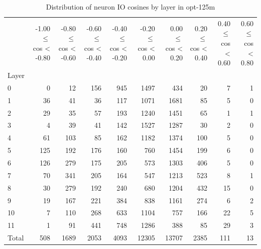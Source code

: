 \begin{table}
\caption{Distribution of neuron IO cosines by layer in opt-125m}
\label{tab:opt-125m_half_coarse}
\begin{tabular}{lrrrrrrrrr}
 & -1.00 $\leq$ cos < -0.80 & -0.80 $\leq$ cos < -0.60 & -0.60 $\leq$ cos < -0.40 & -0.40 $\leq$ cos < -0.20 & -0.20 $\leq$ cos < 0.00 & 0.00 $\leq$ cos < 0.20 & 0.20 $\leq$ cos < 0.40 & 0.40 $\leq$ cos < 0.60 & 0.60 $\leq$ cos < 0.80 \\
Layer &  &  &  &  &  &  &  &  &  \\
0 & 0 & 12 & 156 & 945 & 1497 & 434 & 20 & 7 & 1 \\
1 & 36 & 41 & 36 & 117 & 1071 & 1681 & 85 & 5 & 0 \\
2 & 29 & 35 & 57 & 193 & 1240 & 1451 & 65 & 1 & 1 \\
3 & 4 & 39 & 41 & 142 & 1527 & 1287 & 30 & 2 & 0 \\
4 & 61 & 103 & 85 & 162 & 1182 & 1374 & 100 & 5 & 0 \\
5 & 125 & 192 & 176 & 160 & 760 & 1454 & 199 & 6 & 0 \\
6 & 126 & 279 & 175 & 205 & 573 & 1303 & 406 & 5 & 0 \\
7 & 70 & 341 & 205 & 164 & 547 & 1213 & 523 & 8 & 1 \\
8 & 30 & 279 & 192 & 240 & 680 & 1204 & 432 & 15 & 0 \\
9 & 19 & 167 & 221 & 384 & 838 & 1161 & 274 & 6 & 2 \\
10 & 7 & 110 & 268 & 633 & 1104 & 757 & 166 & 22 & 5 \\
11 & 1 & 91 & 441 & 748 & 1286 & 388 & 85 & 29 & 3 \\
Total & 508 & 1689 & 2053 & 4093 & 12305 & 13707 & 2385 & 111 & 13 \\
\end{tabular}
\end{table}
